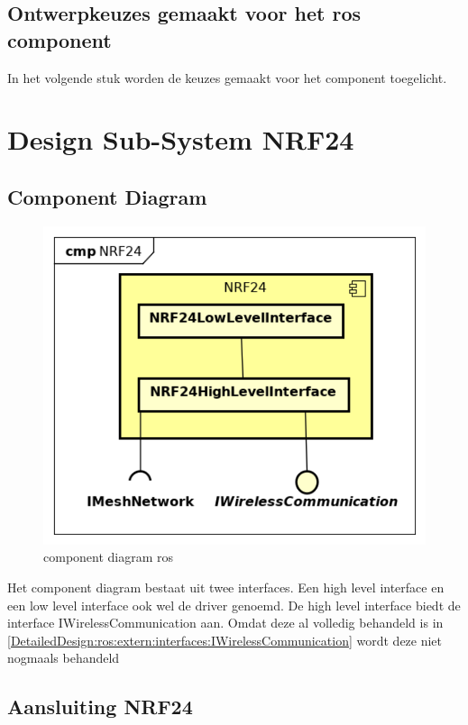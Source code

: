 \documentclass[a4paper, 11pt, oneside]{report}
\begin{document}
\subsection{Ontwerpkeuzes gemaakt voor het ros component}
\label{DetailedDesign:ros:ontwerkeuzes}
In het volgende stuk worden de keuzes gemaakt voor het component toegelicht.

\section{Design Sub-System NRF24}
\label{DetailedDesign:NRF24}

\subsection{Component Diagram}
\label{DetailedDesign:NRF24:ComponentDiagram}
\begin{figure}[H]
	\begin{center}\includegraphics[width=.5\linewidth]{Afbeeldingen/NRF24ComponentDiagram.png}\end{center}
	\caption{component diagram ros}
	\label{fig:component:NRF24}
\end{figure}

Het component diagram bestaat uit twee interfaces. Een high level interface en een low level interface ook wel de driver genoemd.
De high level interface biedt de interface IWirelessCommunication aan. Omdat deze al volledig behandeld is in \autoref{DetailedDesign:ros:extern:interfaces:IWirelessCommunication}  wordt deze niet nogmaals behandeld

\subsection{Aansluiting NRF24}
\end{document}
